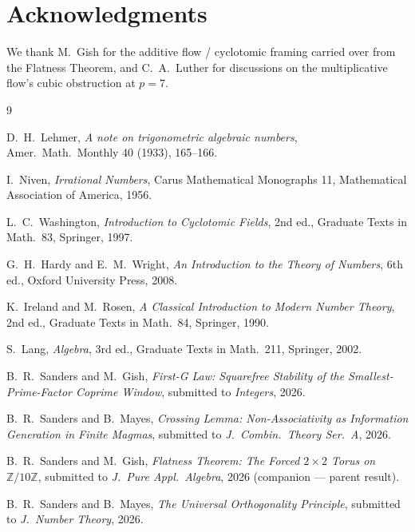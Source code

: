 \documentclass[11pt,reqno]{amsart}
\theoremstyle{plain}
\theoremstyle{definition}
\newcommand{\Z}{\mathbb{Z}}
\begin{document}
\section*{Acknowledgments}

We thank M.~Gish for the additive flow / cyclotomic framing carried over from the Flatness Theorem, and C.~A.~Luther for discussions on the multiplicative flow's cubic obstruction at $p = 7$.

\begin{thebibliography}{9}

D.~H.~Lehmer,
\emph{A note on trigonometric algebraic numbers},
Amer.\ Math.\ Monthly 40 (1933), 165--166.

I.~Niven,
\emph{Irrational Numbers},
Carus Mathematical Monographs 11, Mathematical Association of America, 1956.

L.~C.~Washington,
\emph{Introduction to Cyclotomic Fields}, 2nd ed.,
Graduate Texts in Math.\ 83, Springer, 1997.

G.~H.~Hardy and E.~M.~Wright,
\emph{An Introduction to the Theory of Numbers}, 6th ed.,
Oxford University Press, 2008.

K.~Ireland and M.~Rosen,
\emph{A Classical Introduction to Modern Number Theory}, 2nd ed.,
Graduate Texts in Math.\ 84, Springer, 1990.

S.~Lang,
\emph{Algebra}, 3rd ed.,
Graduate Texts in Math.\ 211, Springer, 2002.

B.~R.~Sanders and M.~Gish,
\emph{First-G Law: Squarefree Stability of the Smallest-Prime-Factor Coprime Window},
submitted to \emph{Integers}, 2026.

B.~R.~Sanders and B.~Mayes,
\emph{Crossing Lemma: Non-Associativity as Information Generation in Finite Magmas},
submitted to \emph{J.\ Combin.\ Theory Ser.\ A}, 2026.

B.~R.~Sanders and M.~Gish,
\emph{Flatness Theorem: The Forced $2 \times 2$ Torus on $\Z/10\Z$},
submitted to \emph{J.\ Pure Appl.\ Algebra}, 2026 (companion --- parent result).

B.~R.~Sanders and B.~Mayes,
\emph{The Universal Orthogonality Principle},
submitted to \emph{J.\ Number Theory}, 2026.

\end{thebibliography}
\end{document}
